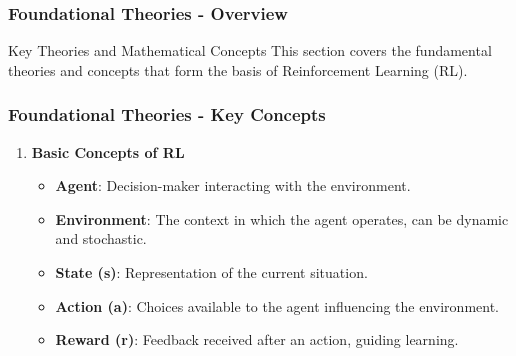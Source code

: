 \documentclass[aspectratio=169]{beamer}
\begin{document}
\begin{frame}[fragile]
    \frametitle{Foundational Theories - Overview}
    \begin{block}{Key Theories and Mathematical Concepts}
        This section covers the fundamental theories and concepts that form the basis of Reinforcement Learning (RL).
    \end{block}
\end{frame}

\begin{frame}[fragile]
    \frametitle{Foundational Theories - Key Concepts}
    \begin{enumerate}
        \item \textbf{Basic Concepts of RL}
        \begin{itemize}
            \item \textbf{Agent}: Decision-maker interacting with the environment.
            \item \textbf{Environment}: The context in which the agent operates, can be dynamic and stochastic.
            \item \textbf{State (s)}: Representation of the current situation.
            \item \textbf{Action (a)}: Choices available to the agent influencing the environment.
            \item \textbf{Reward (r)}: Feedback received after an action, guiding learning.
        \end{itemize}
    \end{enumerate}
\end{frame}
\end{document}
